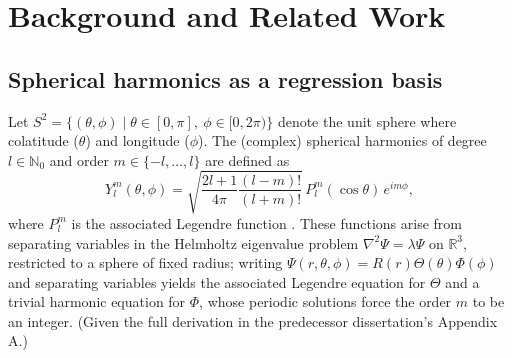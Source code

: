 \chapter{Background and Related Work}
\label{ch:background}

\section{Spherical harmonics as a regression basis}
\label{sec:sh-background}
 
Let $S^2 = \{(\theta,\phi) \mid \theta \in [0,\pi],\ \phi \in [0,2\pi)\}$ denote the unit sphere where colatitude ($\theta$) and longitude ($\phi$). The (complex) spherical harmonics of degree $l \in \mathbb{N}_0$ and order $m \in \{-l,\dots,l\}$ are defined as
\begin{equation}
    Y_l^m(\theta,\phi) = \sqrt{\frac{2l+1}{4\pi}\frac{(l-m)!}{(l+m)!}}\, P_l^m(\cos\theta)\, e^{im\phi},
    \label{eq:sph-harm}
\end{equation}
where $P_l^m$ is the associated Legendre function \citep{thomas2025}. These functions arise from separating variables in the Helmholtz eigenvalue problem $\nabla^2\Psi = \lambda\Psi$ on $\mathbb{R}^3$, restricted to a sphere of fixed radius; writing $\Psi(r,\theta,\phi)=R(r)\Theta(\theta)\Phi(\phi)$ and separating variables yields the associated Legendre equation for $\Theta$ and a trivial harmonic equation for $\Phi$, whose periodic solutions force the order $m$ to be an integer. (Given the full derivation in the predecessor dissertation's Appendix A.)
 
